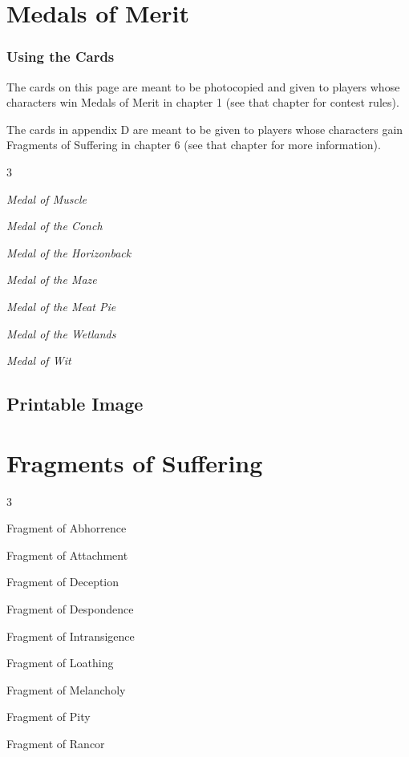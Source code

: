 \documentclass[10pt,a4paper,twoside,bg=print,twocolumn,openany,nodeprecatedcode]{dndbook}
\begin{document}
\chapter{Medals of Merit}
\subsection{Using the Cards}
The cards on this page are meant to be photocopied and given to players whose characters win Medals of Merit in chapter 1 (see that chapter for contest rules).

The cards in appendix D are meant to be given to players whose characters gain Fragments of Suffering in chapter 6 (see that chapter for more information).


\begin{itemize}
\begin{multicols}{3}
\item \textit{Medal of Muscle}
\item \textit{Medal of the Conch}
\item \textit{Medal of the Horizonback}
\item \textit{Medal of the Maze}
\item \textit{Medal of the Meat Pie}
\item \textit{Medal of the Wetlands}
\item \textit{Medal of Wit}
\end{multicols}

\end{itemize}

\section{Printable Image}
\chapter{Fragments of Suffering}

\begin{itemize}
\begin{multicols}{3}
\item Fragment of Abhorrence
\item Fragment of Attachment
\item Fragment of Deception
\item Fragment of Despondence
\item Fragment of Intransigence
\item Fragment of Loathing
\item Fragment of Melancholy
\item Fragment of Pity
\item Fragment of Rancor
\end{multicols}

\end{itemize}
\end{document}
